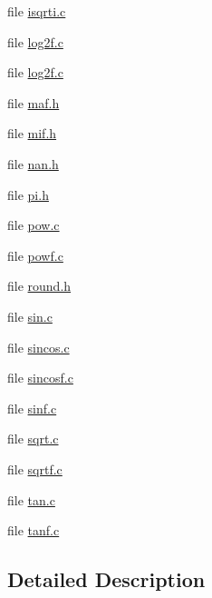 \begin{DoxyCompactItemize}
file \hyperlink{isqrti_8c}{isqrti.\-c}
\item 
file \hyperlink{log2f_8c}{log2f.\-c}
\item 
file \hyperlink{log2f_8c}{log2f.\-c}
\item 
file \hyperlink{maf_8h}{maf.\-h}
\item 
file \hyperlink{mif_8h}{mif.\-h}
\item 
file \hyperlink{nan_8h}{nan.\-h}
\item 
file \hyperlink{pi_8h}{pi.\-h}
\item 
file \hyperlink{pow_8c}{pow.\-c}
\item 
file \hyperlink{powf_8c}{powf.\-c}
\item 
file \hyperlink{round_8h}{round.\-h}
\item 
file \hyperlink{sin_8c}{sin.\-c}
\item 
file \hyperlink{sincos_8c}{sincos.\-c}
\item 
file \hyperlink{sincosf_8c}{sincosf.\-c}
\item 
file \hyperlink{sinf_8c}{sinf.\-c}
\item 
file \hyperlink{sqrt_8c}{sqrt.\-c}
\item 
file \hyperlink{sqrtf_8c}{sqrtf.\-c}
\item 
file \hyperlink{tan_8c}{tan.\-c}
\item 
file \hyperlink{tanf_8c}{tanf.\-c}
\end{DoxyCompactItemize}


\subsection{Detailed Description}
